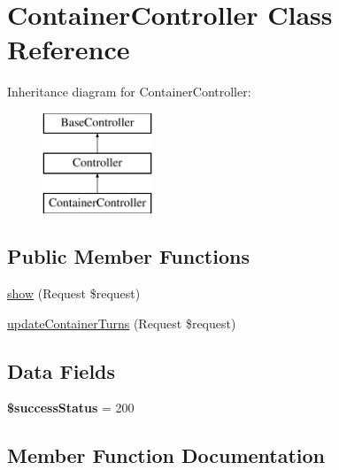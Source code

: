 \hypertarget{class_app_1_1_http_1_1_controllers_1_1_a_p_i_1_1_container_controller}{}\section{Container\+Controller Class Reference}
\label{class_app_1_1_http_1_1_controllers_1_1_a_p_i_1_1_container_controller}
Inheritance diagram for Container\+Controller\+:\begin{figure}[H]
\begin{center}
\leavevmode
\includegraphics[height=3.000000cm]{class_app_1_1_http_1_1_controllers_1_1_a_p_i_1_1_container_controller}
\end{center}
\end{figure}
\subsection*{Public Member Functions}
\begin{DoxyCompactItemize}
\item 
\mbox{\hyperlink{class_app_1_1_http_1_1_controllers_1_1_a_p_i_1_1_container_controller_a5ab3bd1c209b4353ac32bd7ee51985d2}{show}} (Request \$request)
\item 
\mbox{\hyperlink{class_app_1_1_http_1_1_controllers_1_1_a_p_i_1_1_container_controller_a4e7f78121af37bfccc0b0274e280d37e}{update\+Container\+Turns}} (Request \$request)
\end{DoxyCompactItemize}
\subsection*{Data Fields}
\begin{DoxyCompactItemize}
\item 
\mbox{\label{class_app_1_1_http_1_1_controllers_1_1_a_p_i_1_1_container_controller_a4fde01aada3b602338d7002a598a8763}} 
{\bfseries \$success\+Status} = 200
\end{DoxyCompactItemize}


\subsection{Member Function Documentation}
\mbox{\label{class_app_1_1_http_1_1_controllers_1_1_a_p_i_1_1_container_controller_a5ab3bd1c209b4353ac32bd7ee51985d2}} 
